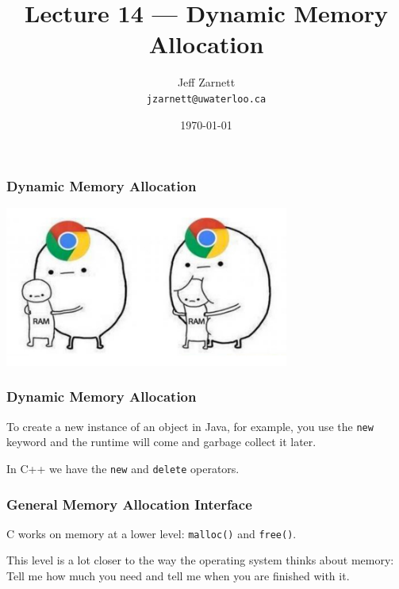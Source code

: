 

\title{Lecture 14 --- Dynamic Memory Allocation}

\author{Jeff Zarnett \\ \small \texttt{jzarnett@uwaterloo.ca}}
\date{\today}




\begin{frame}
  \titlepage

 \end{frame}
 
 
\begin{frame}
\frametitle{Dynamic Memory Allocation}
 
 \begin{center}
	\includegraphics[width=0.7\textwidth]{images/chrome.jpg}
\end{center}

\end{frame}

\begin{frame}
\frametitle{Dynamic Memory Allocation}

To create a new instance of an object in Java, for example, you use the \texttt{new} keyword and the runtime will come and garbage collect it later.

In C++ we have the \texttt{new} and \texttt{delete} operators. 

\end{frame}

\begin{frame}
\frametitle{General Memory Allocation Interface}

C works on memory at a lower level: \texttt{malloc()} and \texttt{free()}. 

This level is a lot closer to the way the operating system thinks about memory: \\
\quad Tell me how much you need and tell me when you are finished with it.




\end{frame}

